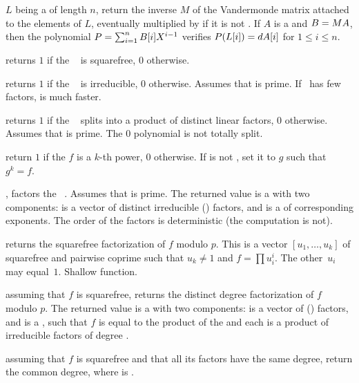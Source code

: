  $L$ being a 
of length $n$, return the inverse $M$ of the Vandermonde matrix attached to
the elements of $L$, eventually multiplied by  if it is not
. If $A$ is a  and $B=M\*A$, then the polynomial
$P=\sum_{i=1}^n B[i]\*X^{i-1}$ verifies $P(L[i])=d\*A[i]$ for
$1 \leq i \leq n$.

 returns $1$ if the
~ is squarefree, $0$ otherwise.

 returns $1$ if the ~
is irreducible, $0$ otherwise. Assumes that  is prime. If~ has
few factors,  is much faster.

 returns $1$ if the
~ splits into a product of distinct linear factors, $0$
otherwise. Assumes that  is prime. The $0$ polynomial is not
totally split.

return $1$ if the  $f$ is a $k$-th power, $0$ otherwise.
If  is not , set it to $g$ such that $g^k = f$.

, factors the ~. Assumes
that  is prime. The returned value  is a  with two
components:  is a vector of distinct irreducible ()
factors, and  is a  of corresponding exponents. The
order of the factors is deterministic (the computation is not).

 returns the squarefree
factorization of $f$ modulo $p$. This is a vector $[u_1,\dots,u_k]$
of squarefree and pairwise coprime  such that $u_k \neq 1$ and $f =
\prod u_i^i$. The other~$u_i$ may equal~$1$.
Shallow function.

 assuming that $f$ is squarefree,
returns the distinct degree factorization of $f$ modulo $p$.
The returned value  is a  with two
components:  is a vector of ()
factors, and  is a , such that
$f$ is equal to the product of the  and each 
is a product of irreducible factors of degree .

 assuming that $f$ is squarefree
and that all its factors have the same degree, return the common degree,
where  is .

